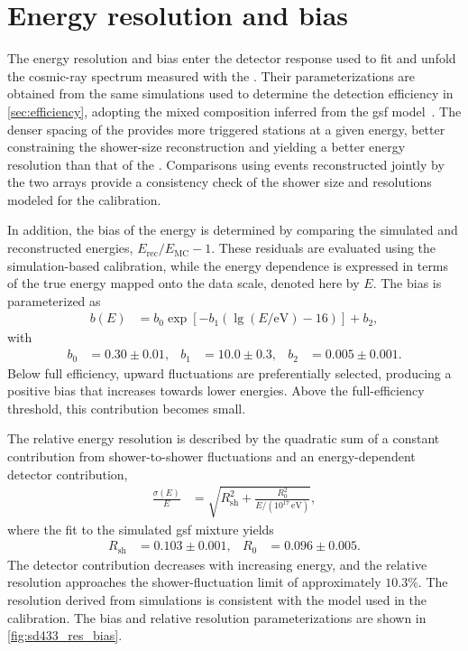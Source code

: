 \documentclass[main.tex]{subfiles}
\begin{document}
\section{Energy resolution and bias}
\label{sec:res_and_bias}

The energy resolution and bias enter the detector response used to fit and unfold the cosmic-ray spectrum measured with the .
Their parameterizations are obtained from the same simulations used to determine the detection efficiency in \cref{sec:efficiency}, adopting the mixed composition inferred from the \gls{gsf} model~\cite{Rodriguez:2026:Thesis}.
The denser spacing of the  provides more triggered stations at a given energy, better constraining the shower-size reconstruction and yielding a better energy resolution than that of the .
Comparisons using events reconstructed jointly by the two arrays provide a consistency check of the  shower size and  resolutions modeled for the calibration.

In addition, the bias of the  energy is determined by comparing the simulated and reconstructed energies, $E_{\mathrm{rec}}/E_{\mathrm{MC}}-1$.
These residuals are evaluated using the simulation-based calibration, while the energy dependence is expressed in terms of the true energy mapped onto the  data scale, denoted here by $E$.
The bias is parameterized as
\begin{align}
    b(E)
    &= b_0\exp\!\left[-b_1\left(\lg(E/\mathrm{eV})-16\right)\right]+b_2,
    \label{eq:energy_bias}
\end{align}
with
\begin{align}
    b_0 &= 0.30 \pm 0.01, &
    b_1 &= 10.0 \pm 0.3, &
    b_2 &= 0.005 \pm 0.001.
\end{align}
Below full efficiency, upward fluctuations are preferentially selected, producing a positive bias that increases towards lower energies.
Above the full-efficiency threshold, this contribution becomes small.

The relative energy resolution is described by the quadratic sum of a constant contribution from shower-to-shower fluctuations and an energy-dependent detector contribution,
\begin{align}
    \frac{\sigma(E)}{E}
    &= \sqrt{R_{\mathrm{sh}}^2
       +\frac{R_0^2}{E/(10^{17}\,\mathrm{eV})}},
    \label{eq:resolution_sigma}
\end{align}
where the fit to the simulated \gls{gsf} mixture yields
\begin{align}
    R_{\mathrm{sh}} &= 0.103 \pm 0.001, &
    R_0 &= 0.096 \pm 0.005.
\end{align}
The detector contribution decreases with increasing energy, and the relative resolution approaches the shower-fluctuation limit of approximately $10.3\%$. 
The resolution derived from simulations is consistent with the model used in the calibration.
The bias and relative resolution parameterizations are shown in \cref{fig:sd433_res_bias}.
\end{document}
